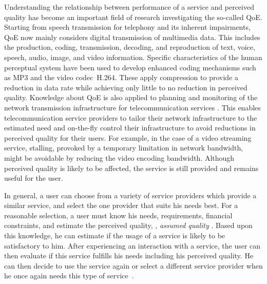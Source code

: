 Understanding the relationship between performance of a service and perceived quality has become an important field of research investigating the so-called \ac{QoE}.
Starting from speech transmission for telephony \citep[][]{ieee_audio_and_electroacoustics_group_ieee_1969} and its inherent impairments, \ac{QoE} now mainly considers digital transmission of multimedia data. %
This includes the production, coding, transmission, decoding, and reproduction of text, voice, speech, audio, image, and video information.
Specific characteristics of the human perceptual system have been used to develop enhanced coding mechanisms such as \ac{MP3} and the video codec~H.264.
These apply compression to provide a reduction in data rate while achieving only little to no reduction in perceived quality.
Knowledge about \ac{QoE} is also applied to planning and monitoring of the network transmission infrastructure for telecommunication services \citep[][]{schatz_qoe-based_2014}.
This enables telecommunication service providers to tailor their network infrastructure to the estimated need and on-the-fly control their infrastructure to avoid reductions in perceived quality for their users.
For example, in the case of a video streaming service, stalling, provoked by a temporary limitation in network bandwidth, might be avoidable by reducing the video encoding bandwidth.
Although perceived quality is likely to be affected, the service is still provided and remains useful for the user.

In general, a user can choose from a variety of service providers which provide a similar service, and select the one provider that suits his needs best.
For a reasonable selection, a user must know his needs, requirements, financial constraints, and estimate the perceived quality, \ie, \emph{assumed quality} \citep[][p.\,13]{raake_quality_2014}.
Based upon this knowledge, he can estimate if the usage of a service is likely to be satisfactory to  him.
After experiencing an interaction with a service, the user can then evaluate if this service fulfills his needs including his perceived quality.
He can then decide to use the service again or select a different service provider when he once again needs this type of service~\citep[][]{geerts_linking_2010}.

